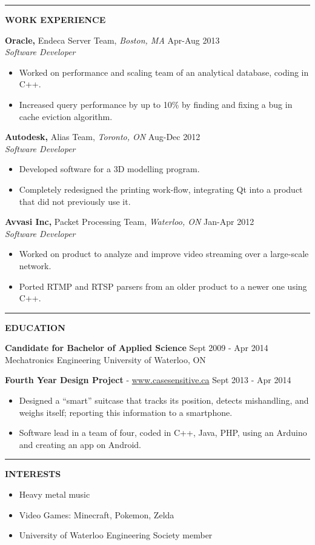 \documentclass{letter}
\begin{document}
\vskip 2pt
\hrule
{\large\bf WORK EXPERIENCE}

{\bf Oracle,} Endeca Server Team, {\sl Boston, MA} \hfill Apr-Aug 2013 \\
{\sl Software Developer}
\begin{itemize}
  \item Worked on performance and scaling team of an analytical database, coding in C++.
  \item Increased query performance by up to 10\% by finding and fixing a bug in cache eviction algorithm.
\end{itemize}

{\bf Autodesk,} Alias Team, {\sl Toronto, ON} \hfill Aug-Dec 2012 \\
{\sl Software Developer}
\begin{itemize}
  \item Developed software for a 3D modelling program.
  \item Completely redesigned the printing work-flow, integrating Qt into a product that did not previously use it.
\end{itemize}

{\bf Avvasi Inc,} Packet Processing Team, {\sl Waterloo, ON} \hfill Jan-Apr 2012 \\
{\sl Software Developer}
\begin{itemize}
  \item Worked on product to analyze and improve video streaming over a large-scale network.
  \item Ported RTMP and RTSP parsers from an older product to a newer one using C++.
\end{itemize}

\vskip 2pt
\hrule
{\large\bf EDUCATION}

{\bf Candidate for Bachelor of Applied Science} \hfill Sept 2009 - Apr 2014 \\
Mechatronics Engineering \hfill University of Waterloo, ON

{\bf Fourth Year Design Project} - \href{http://www.casesensitive.ca}{www.casesensitive.ca} \hfill Sept 2013 - Apr 2014
\begin{itemize}
  \item Designed a ``smart'' suitcase that tracks its position, detects mishandling, and weighs itself; reporting this information to a smartphone.
  \item Software lead in a team of four, coded in C++, Java, PHP, using an Arduino and creating an app on Android.
\end{itemize}

\vskip 2pt
\hrule
{\large\bf INTERESTS}
\begin{itemize}
  \item Heavy metal music
  \item Video Games: Minecraft, Pokemon, Zelda
  \item University of Waterloo Engineering Society member
\end{itemize}
\end{document}
